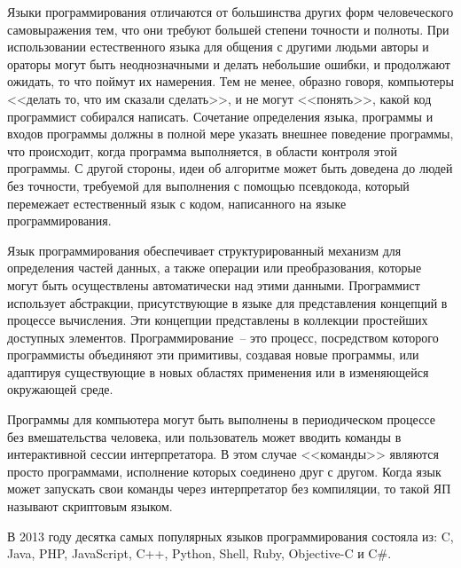 Языки программирования отличаются от большинства других форм человеческого
самовыражения тем, что они требуют большей степени точности и полноты. При
использовании естественного языка для общения с другими людьми авторы и ораторы
могут быть неоднозначными и делать небольшие ошибки, и продолжают ожидать, то
что поймут их намерения. Тем не менее, образно говоря, компьютеры <<делать то,
что им сказали сделать>>, и не могут <<понять>>, какой код программист
собирался написать. Сочетание определения языка, программы и входов программы
должны в полной мере указать внешнее поведение программы, что происходит, когда
программа выполняется, в области контроля этой программы. С другой стороны,
идеи об алгоритме может быть доведена до людей без точности, требуемой для
выполнения с помощью псевдокода, который перемежает естественный язык с кодом,
написанного на языке программирования.

Язык программирования обеспечивает структурированный механизм для определения
частей данных, а также операции или преобразования, которые могут быть
осуществлены автоматически над этими данными. Программист использует
абстракции, присутствующие в языке для представления концепций в процессе
вычисления. Эти концепции представлены в коллекции простейших доступных
элементов. Программирование~-- это процесс, посредством которого программисты
объединяют эти примитивы, создавая новые программы, или адаптируя существующие
в новых областях применения или в изменяющейся окружающей среде.

Программы для компьютера могут быть выполнены в периодическом процессе без
вмешательства человека, или пользователь может вводить команды в интерактивной
сессии интерпретатора. В этом случае <<команды>> являются просто программами,
исполнение которых соединено друг с другом. Когда язык может запускать свои
команды через интерпретатор без компиляции, то такой ЯП называют скриптовым
языком.

В 2013 году десятка самых популярных языков программирования состояла из: C,
Java, PHP, JavaScript, C++, Python, Shell, Ruby, Objective-C и C\#.
